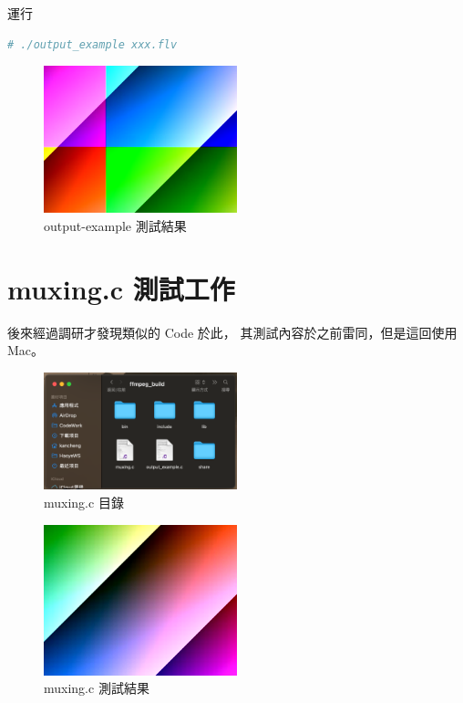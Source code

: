 \documentclass[10pt,UTF8]{ctexart}
\begin{document}
運行

\begin{lstlisting}[language={python}]
# ./output_example xxx.flv
\end{lstlisting}

\begin{figure}[H]
\centering 
\includegraphics[width=0.50\textwidth]{tem1.png} 
\caption{output-example 測試結果}
\label{Test}
\end{figure}

\section{muxing.c 測試工作}

後來經過調研才發現類似的 Code 於此， 其測試內容於之前雷同，但是這回使用 Mac。

\begin{figure}[H]
\centering 
\includegraphics[width=0.50\textwidth]{new.png} 
\caption{muxing.c 目錄}
\label{Test}
\end{figure}

\begin{figure}[H]
\centering 
\includegraphics[width=0.50\textwidth]{tem2.png} 
\caption{muxing.c 測試結果}
\label{Test}
\end{figure}
\end{document}
